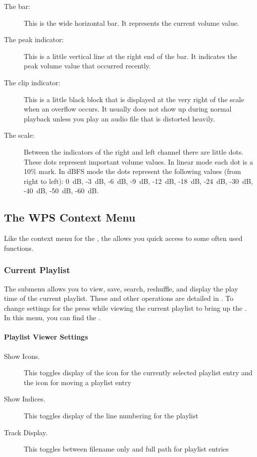 \begin{description}
\item [The bar:]
  This is the wide horizontal bar. It represents the current volume value.
\item [The peak indicator:]
  This is a little vertical line at the right end of the bar. It indicates
  the peak volume value that occurred recently.
\item [The clip indicator:]
  This is a little black block that is displayed at the very right of the
  scale when an overflow occurs. It usually does not show up during normal
  playback unless you play an audio file that is distorted heavily.
\item [The scale:]
  Between the indicators of the right and left channel there are little dots.
  These dots represent important volume values. In linear mode each dot is a
  10\% mark. In dBFS mode the dots represent the following values (from right
  to left): 0~dB, {}-3~dB, {}-6~dB, {}-9~dB, {}-12~dB, {}-18~dB, {}-24~dB, {}-30~dB,
  {}-40~dB, {}-50~dB, {}-60~dB.
\end{description}

\subsection{\label{sec:contextmenu}The WPS Context Menu}
Like the context menu for the , the 
allows you quick access to some often used functions.

\subsubsection{Current Playlist}
The  submenu allows you to view, save, search, reshuffle,
and display the play time of the current playlist. These and other operations
are detailed in . To change settings for
the  press \ActionStdContext{} while viewing the
current playlist to bring up the . In this
menu, you can find the .

\paragraph{Playlist Viewer Settings}
  \begin{description}
    \item[Show Icons.] This toggles display of the icon for the currently
    selected playlist entry and the icon for moving a playlist entry
    \item[Show Indices.] This toggles display of the line numbering for
       the playlist
    \item[Track Display.] This toggles between filename only and full path
       for playlist entries
  \end{description}


